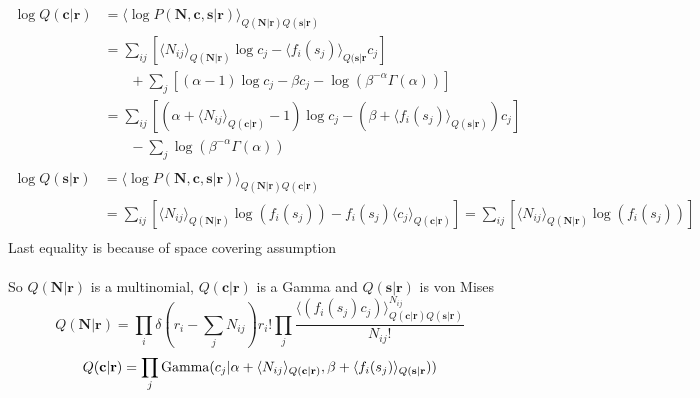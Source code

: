 \documentclass[12pt]{article}
\begin{document}
\begin{equation}
\begin{aligned}
\log Q(\mathbf{c|r}) &= \langle \log P(\mathbf{N, c, s|r}) \rangle_{Q(\mathbf{N|r})Q(\mathbf{s|r})}\\
&= \sum_{ij} [\langle N_{ij} \rangle_{Q(\mathbf{N|r})} \log c_j - \langle f_i (s_j)\rangle_{Q(\mathbf{s|r}}c_j]\\
& \phantom{{}=1}+ \sum_j [(\alpha - 1) \log c_j - \beta c_j - \log (\beta^{- \alpha} \Gamma (\alpha))]\\
&= \sum_{ij} [(\alpha + \langle N_{ij} \rangle_{Q(\mathbf{c|r})} - 1) \log c_j - (\beta + \langle f_i (s_j)\rangle_{Q(\mathbf{s|r})}) c_j]\\
& \phantom{{}=1}- \sum_j \log (\beta^{- \alpha} \Gamma (\alpha))\\
\end{aligned}
\end{equation}
\begin{equation}
\begin{aligned}
\log Q(\mathbf{s|r}) &= \langle \log P(\mathbf{N, c, s|r}) \rangle_{Q(\mathbf{N|r})Q(\mathbf{c|r})}\\
&= \sum_{ij} [\langle N_{ij} \rangle_{Q(\mathbf{N|r})} \log(f_i(s_j)) - f_i(s_j) \langle c_j \rangle_{Q(\mathbf{c|r})}] = \sum_{ij} [\langle N_{ij} \rangle_{Q(\mathbf{N|r})} \log(f_i(s_j))]\\
\end{aligned}
\end{equation}
Last equality is because of space covering assumption\\
\\
So $Q(\mathbf{N|r})$ is a multinomial, $Q(\mathbf{c|r})$ is a Gamma and $Q(\mathbf{s|r})$ is von Mises\\
\begin{equation}
Q(\mathbf{N|r}) = \prod_i \delta(r_i - \sum_j N_{ij}) r_i! \prod_j \frac{\langle (f_i (s_j) c_j) \rangle_{Q(\mathbf{c|r})Q(\mathbf{s|r})}^{N_{ij}}}{N_{ij}!}
\end{equation}
\begin{equation}
Q(\mathbf{c|r}) = \prod_j \text{Gamma} (c_j|\alpha + \langle N_{ij} \rangle_{Q(\mathbf{c|r})}, \beta + \langle f_i (s_j)\rangle_{Q(\mathbf{s|r}}))\\
\end{equation}
\end{document}
